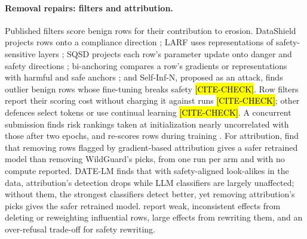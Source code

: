 \documentclass{article}
\theoremstyle{plain}
\theoremstyle{definition}
\theoremstyle{remark}
\newcommand{\ph}[1]{\hl{#1}}
\begin{document}
\paragraph{Removal repairs: filters and attribution.}
Published filters score benign rows for their contribution to erosion.
DataShield projects rows onto a compliance direction
\citep{zhang2026datashield}; LARF uses representations of safety-sensitive
layers \citep{li2025larf}; SQSD projects each row's parameter update onto
danger and safety directions \citep{wang2026sqsd}; bi-anchoring compares a
row's gradients or representations with harmful and safe anchors
\citep{he2024safe}; and Self-Inf-N, proposed as an attack, finds outlier benign
rows whose fine-tuning breaks safety \citep{guan2025benign}
\ph{[CITE-CHECK]}. Row filters report their scoring cost without charging it
against runs \citep{zhang2026datashield,hu2026gradshield} \ph{[CITE-CHECK]};
other defences select tokens \citep{li2026toss} or use continual learning
\citep{alssum2025unforgotten} \ph{[CITE-CHECK]}. A concurrent submission
finds risk rankings taken at initialization nearly uncorrelated with those
after two epochs, and re-scores rows during training
\citep{anonymous2026saba}. For
attribution, \citet{pan2026detecting} find that removing rows flagged by
gradient-based attribution gives a safer retrained model than removing
WildGuard's picks, from one run per arm and with no compute reported. DATE-LM \citep{jiao2025datelm} finds that with safety-aligned
look-alikes in the data, attribution's detection drops while LLM classifiers
are largely unaffected; without them, the strongest classifiers detect better,
yet removing attribution's picks gives the safer retrained model.
\citet{luo2026reweighting} report weak, inconsistent effects from deleting or
reweighting influential rows, large effects from rewriting them, and an
over-refusal trade-off for safety rewriting.
\end{document}
